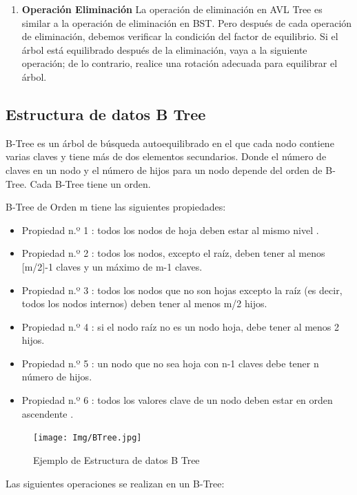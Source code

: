 \documentclass{article}
\begin{document}
\begin{enumerate}
		\item \textbf{Operación Eliminación}
				La operación de eliminación en AVL Tree es similar a la operación de eliminación en BST. Pero después de cada operación de eliminación, debemos verificar la condición del factor de equilibrio. Si el árbol está equilibrado después de la eliminación, vaya a la siguiente operación; de lo contrario, realice una rotación adecuada para equilibrar el árbol.
			\end{enumerate}
		
		

		\subsection{Estructura de datos B Tree}

B-Tree es un árbol de búsqueda autoequilibrado en el que cada nodo contiene varias claves y tiene más de dos elementos secundarios. Donde el número de claves en un nodo y el número de hijos para un nodo depende del orden de B-Tree. Cada B-Tree tiene un orden.

B-Tree de Orden m tiene las siguientes propiedades:
\begin{itemize}
   \item Propiedad n.º 1 : todos los nodos de hoja deben estar al mismo nivel .
   \item Propiedad n.º 2 : todos los nodos, excepto el raíz, deben tener al menos [m/2]-1 claves y un máximo de m-1 claves.
   \item Propiedad n.º 3 : todos los nodos que no son hojas excepto la raíz (es decir, todos los nodos internos) deben tener al menos m/2 hijos.
   \item Propiedad n.º 4 : si el nodo raíz no es un nodo hoja, debe tener al menos 2 hijos.
   \item Propiedad n.º 5 : un nodo que no sea hoja con n-1 claves debe tener n número de hijos.
   \item Propiedad n.º 6 : todos los valores clave de un nodo deben estar en orden ascendente .
\end{itemize}


\begin{figure}[H]
\centering
\texttt{[image: Img/BTree.jpg]}
\caption{Ejemplo de Estructura de datos B Tree}
\end{figure}


Las siguientes operaciones se realizan en un B-Tree:
\end{document}
